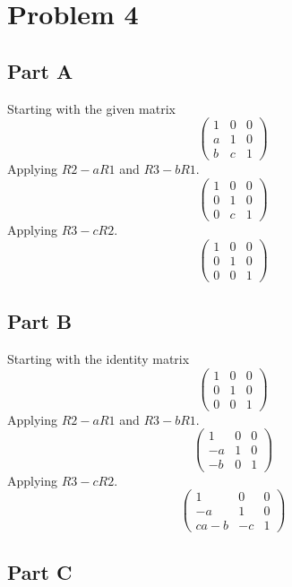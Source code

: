 \documentclass{article}
\begin{document}
\section*{Problem 4}

\subsection*{Part A}

Starting with the given matrix
\[
    \begin{pmatrix}
        1 & 0 & 0 \\
        a & 1 & 0 \\
        b & c & 1
    \end{pmatrix}
\]
Applying $ R2 - a R1 $ and $ R3 - b R1 $.
\[
    \begin{pmatrix}
        1 & 0 & 0 \\
        0 & 1 & 0 \\
        0 & c & 1
    \end{pmatrix}
\]
Applying $ R3 - c R2 $.
\[
    \begin{pmatrix}
        1 & 0 & 0 \\
        0 & 1 & 0 \\
        0 & 0 & 1
    \end{pmatrix}
\]

\subsection*{Part B}

Starting with the identity matrix
\[
    \begin{pmatrix}
        1 & 0 & 0 \\
        0 & 1 & 0 \\
        0 & 0 & 1
    \end{pmatrix}
\]
Applying $ R2 - a R1 $ and $ R3 - b R1 $.
\[
    \begin{pmatrix}
        1 & 0 & 0 \\
        -a & 1 & 0 \\
        -b & 0 & 1
    \end{pmatrix}
\]
Applying $ R3 - c R2 $.
\[
    \begin{pmatrix}
        1 & 0 & 0 \\
        -a & 1 & 0 \\
        ca - b & -c & 1
    \end{pmatrix}
\]

\subsection*{Part C}
\end{document}
